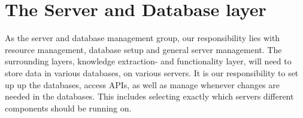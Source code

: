 \section{The Server and Database layer}

As the server and database management group, our responsibility lies with resource management, database setup and general server management. The surrounding layers, knowledge extraction- and functionality layer, will need to store data in various databases, on various servers. It is our responsibility to set up up the databases, access APIs, as well as manage whenever changes are needed in the databases. This includes selecting exactly which servers different components should be running on.

